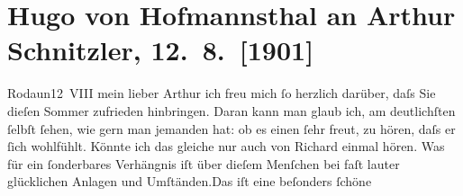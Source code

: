 

         
         \renewcommand{\erwaehntePersonen}{Personen: Richard Beer-Hofmann, Hugo von Hofmannsthal, Gertrude von Hofmannsthal}
         \renewcommand{\erwaehnteInstitutionen}{Institutionen: Westbahnstrecke}
         \renewcommand{\erwaehnteOrte}{Orte: Heiligenkreuz, Niederösterreich, Pressbaum, Rodaun, Sulz im Wienerwald, Tullnerbach, Wien}
         \renewcommand{\erwaehnteWerke}{Werke: Pompilia oder das Leben}
               \section[Hugo von Hofmannsthal an Arthur Schnitzler, 12. 8. {[}1901{]}]{ Hugo von Hofmannsthal an Arthur Schnitzler, 12. 8. {[}1901{]}}\nopagebreak{}\rehead{ }\begin{ledgroupsized}[t]{13cm}\normalsize\beginnumbering \toendnotes[C]{\smallbreak\pagebreak[2]} 
\toendnotes[C]{\smallbreak}\pstart
           \raggedleft{}{\pb}Rodaun12 VIII\pend
           \pstart{}mein lieber Arthur \pend\pstart
           ich freu mich ſo herzlich darüber, daſs Sie dieſen Sommer zufrieden hinbringen. Daran
               kann man glaub ich, am deutlichſten ſelbſt ſehen, wie gern man jemanden hat: ob es
               einen ſehr freut, zu hören, daſs er ſich wohlfühlt. Könnte ich das gleiche nur auch
               von Richard einmal hören. Was für ein
               ſonderbares Verhängnis iſt über dieſem Menſchen bei faſt lauter glücklichen Anlagen
               und Umſtänden.\hspace*{1.5em}Das iſt {\pb}eine beſonders ſchöne

\end{ledgroupsized}
